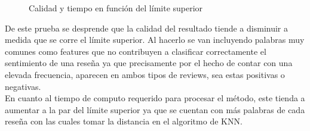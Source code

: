 \begin{figure}[H]
\caption{Calidad y tiempo en función del límite superior}
\label{fig:exp2-metricas-ul}
\end{figure}

De este prueba se desprende que la calidad del resultado tiende a disminuir a medida que se corre el límite superior. Al hacerlo se van incluyendo palabras muy comunes como features que no contribuyen a clasificar correctamente el sentimiento de una reseña ya que precisamente por el hecho de contar con una elevada frecuencia, aparecen en ambos tipos de reviews, sea estas positivas o negativas. \\

En cuanto al tiempo de computo requerido para procesar el método, este tienda a aumentar a la par del límite superior ya que se cuentan con más palabras de cada reseña con las cuales tomar la distancia en el algoritmo de KNN. \\


